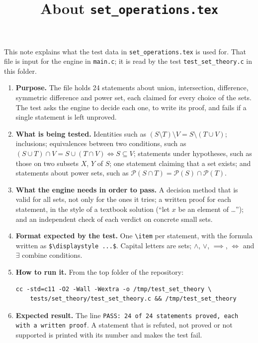 \documentclass[11pt,a4paper]{article}
\title{About \texttt{set\_operations.tex}}
\author{}
\date{}
\begin{document}
\maketitle
This note explains what the test data in \texttt{set\_operations.tex} is used for. That file is input for the engine in \texttt{main.c}; it is read by the test \texttt{test\_set\_theory.c} in this folder.

\begin{enumerate}
\item \textbf{Purpose.} The file holds 24 statements about union, intersection, difference, symmetric difference and power set, each claimed for every choice of the sets. The test asks the engine to decide each one, to write its proof, and fails if a single statement is left unproved.

\item \textbf{What is being tested.} Identities such as $(S \setminus T) \setminus V = S \setminus (T \cup V)$; inclusions; equivalences between two conditions, such as $(S \cup T) \cap V = S \cup (T \cap V) \iff S \subseteq V$; statements under hypotheses, such as those on two subsets $X$, $Y$ of $S$; one statement claiming that a set exists; and statements about power sets, such as $\mathcal{P}(S \cap T) = \mathcal{P}(S) \cap \mathcal{P}(T)$.

\item \textbf{What the engine needs in order to pass.} A decision method that is valid for all sets, not only for the ones it tries; a written proof for each statement, in the style of a textbook solution (``let $x$ be an element of \dots''); and an independent check of each verdict on concrete small sets.

\item \textbf{Format expected by the test.} One \texttt{\textbackslash item} per statement, with the formula written as \texttt{\$\textbackslash displaystyle ...\$}. Capital letters are sets; $\land$, $\lor$, $\implies$, $\iff$ and $\exists$ combine conditions.

\item \textbf{How to run it.} From the top folder of the repository:
\begin{verbatim}
cc -std=c11 -O2 -Wall -Wextra -o /tmp/test_set_theory \
    tests/set_theory/test_set_theory.c && /tmp/test_set_theory
\end{verbatim}

\item \textbf{Expected result.} The line \texttt{PASS: 24 of 24 statements proved, each with a written proof}. A statement that is refuted, not proved or not supported is printed with its number and makes the test fail.
\end{enumerate}
\end{document}
